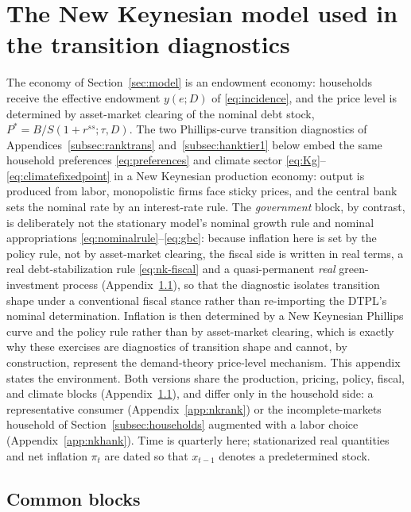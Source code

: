 \documentclass[12pt]{article}
\newcommand{\Sfun}{S}
\begin{document}
\section{The New Keynesian model used in the transition
diagnostics}\label{app:nkmodel}

The economy of Section~\ref{sec:model} is an endowment economy:
households receive the effective endowment $y(e;D)$ of
\eqref{eq:incidence}, and the price level is determined by asset-market
clearing of the nominal debt stock, $P^\ast=B/\Sfun(1+r^{ss};\tau,D)$. The
two Phillips-curve transition diagnostics of Appendices~\ref{subsec:ranktrans}
and~\ref{subsec:hanktier1} below embed the same household preferences
\eqref{eq:preferences} and climate sector
\eqref{eq:Kg}--\eqref{eq:climatefixedpoint} in a New Keynesian production
economy: output is produced from labor, monopolistic firms face sticky
prices, and the central bank sets the nominal rate by an interest-rate
rule. The \emph{government} block, by contrast, is deliberately not
the stationary model's nominal growth rule and nominal appropriations
\eqref{eq:nominalrule}--\eqref{eq:gbc}: because inflation here is set by the
policy rule, not by asset-market clearing, the fiscal side is written in real
terms, a real debt-stabilization rule \eqref{eq:nk-fiscal} and a
quasi-permanent \emph{real} green-investment process (Appendix~\ref{app:nkcommon}), so that the diagnostic isolates transition shape under a
conventional fiscal stance rather than re-importing the DTPL's nominal
determination. Inflation is then determined by a New Keynesian Phillips curve and
the policy rule rather than by asset-market clearing, which is exactly
why these exercises are diagnostics of transition shape and cannot,
by construction, represent the demand-theory price-level mechanism. This
appendix states the environment. Both versions share the production,
pricing, policy, fiscal, and climate blocks (Appendix~\ref{app:nkcommon}), and differ only in the household side: a representative consumer
(Appendix~\ref{app:nkrank}) or the incomplete-markets household of
Section~\ref{subsec:households} augmented with a labor choice
(Appendix~\ref{app:nkhank}). Time is quarterly here; stationarized
real quantities and net inflation $\pi_t$ are dated so that $x_{t-1}$
denotes a predetermined stock.

\subsection{Common blocks}\label{app:nkcommon}
\end{document}
